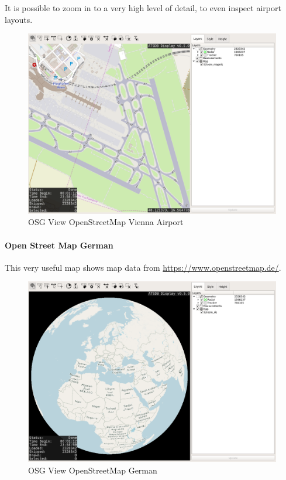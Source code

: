 It is possible to zoom in to a very high level of detail, to even inspect airport layouts.

\begin{figure}[H]
    \hspace*{-2.5cm}
    \includegraphics[width=19cm,frame]{figures/osgview_osm_vienna.png}
  \caption{OSG View OpenStreetMap Vienna Airport}
\end{figure}

\newpage
\paragraph{Open Street Map German}

This very useful map shows map data from \url{https://www.openstreetmap.de/}.

\begin{figure}[H]
    \hspace*{-2.5cm}
    \includegraphics[width=19cm,frame]{figures/osgview_osm_de.png}
  \caption{OSG View OpenStreetMap German}
\end{figure}

